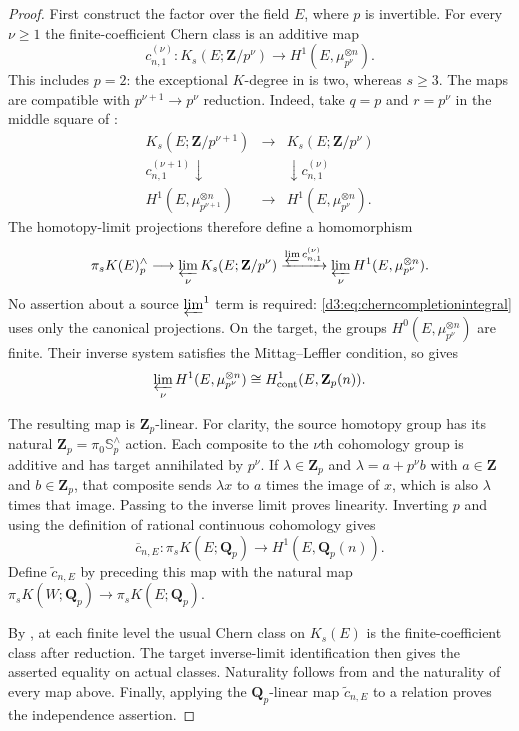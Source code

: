 \documentclass[11pt,a4paper]{amsart}
\numberwithin{equation}{section}
\theoremstyle{definition}
\theoremstyle{remark}
\newcommand{\Q}{\mathbf Q}
\newcommand{\Z}{\mathbf Z}
\begin{document}
\begin{proof}
First construct the factor over the field $E$, where $p$ is invertible.
For every $\nu\geq1$ the finite-coefficient Chern class is an
additive map
\[
 c^{(\nu)}_{n,1}:K_s(E;\Z/p^\nu)
       \longrightarrow H^1(E,\mu_{p^\nu}^{\otimes n}).
\]
This includes $p=2$: the exceptional $K$-degree in
\cite[Proposition~2.4, p.~10]{WeibelChern} is two, whereas $s\geq3$.
The maps are compatible with $p^{\nu+1}\to p^\nu$ reduction.
Indeed, take $q=p$ and $r=p^\nu$ in the middle square of
\cite[Proposition~2.8, p.~12]{WeibelChern}:
\[
\begin{array}{ccc}
 K_s(E;\Z/p^{\nu+1})&\longrightarrow&K_s(E;\Z/p^\nu)\\
 {\scriptstyle c^{(\nu+1)}_{n,1}}\downarrow&&
             \downarrow{\scriptstyle c^{(\nu)}_{n,1}}\\
 H^1(E,\mu_{p^{\nu+1}}^{\otimes n})&\longrightarrow&
                         H^1(E,\mu_{p^\nu}^{\otimes n}).
\end{array}
\]
The homotopy-limit projections therefore define a homomorphism
\begin{equation}\label{d3:eq:cherncompletionintegral}
 \pi_sK(E)^{\wedge}_p
 \longrightarrow\varprojlim_{\nu} K_s(E;\Z/p^\nu)
 \xrightarrow{\varprojlim c^{(\nu)}_{n,1}}
 \varprojlim_{\nu}H^1(E,\mu_{p^\nu}^{\otimes n}).
\end{equation}
No assertion about a source $\varprojlim^{1}$ term is required:
\eqref{d3:eq:cherncompletionintegral} uses only the canonical projections.
On the target, the groups $H^0(E,\mu_{p^\nu}^{\otimes n})$ are
finite. Their inverse system satisfies the Mittag--Leffler condition,
so \cite[equation~(0.2), p.~208]{Jannsen} gives
\[
 \varprojlim_{\nu}H^1(E,\mu_{p^\nu}^{\otimes n})
       \cong H^1_{\mathrm{cont}}(E,\Z_p(n)).
\]

The resulting map is $\Z_p$-linear. For clarity, the source homotopy
group has its natural $\Z_p=\pi_0\mathbb S^{\wedge}_p$ action.
Each composite to the $\nu$th cohomology group is additive and has
target annihilated by $p^\nu$. If $\lambda\in\Z_p$ and
$\lambda=a+p^\nu b$ with $a\in\Z$ and $b\in\Z_p$, that composite
sends $\lambda x$ to $a$ times the image of $x$, which is also
$\lambda$ times that image. Passing to the inverse limit proves
linearity. Inverting $p$ and using the definition of rational
continuous cohomology \cite[equation~(0.4)]{Jannsen} gives
\[
 \overline c_{n,E}:\pi_sK(E;\Q_p)
                 \longrightarrow H^1(E,\Q_p(n)).
\]
Define $\widetilde c_{n,E}$ by preceding this map with the natural
map $\pi_sK(W;\Q_p)\to\pi_sK(E;\Q_p)$.

By \cite[Lemma~2.3, p.~10]{WeibelChern}, at each finite level the
usual Chern class on $K_s(E)$ is the finite-coefficient class after
reduction. The target inverse-limit identification then gives the
asserted equality on actual classes. Naturality follows from
\cite[Proposition~2.1.1]{WeibelChern} and the naturality of every
map above. Finally, applying the $\Q_p$-linear map
$\widetilde c_{n,E}$ to a relation proves the independence assertion.
\end{proof}
\end{document}
